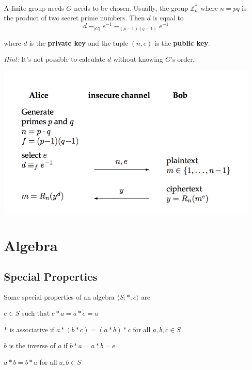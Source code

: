 \documentclass[11pt]{article}
\begin{document}
A finite group needs $G$ needs to be chosen. Usually, the group $\mathbb{Z}_n^*$ where $n=pq$ is the product of two secret prime numbers. Then $d$ is equal to
\begin{equation*}
	d \equiv_{|G|} e^{-1} \equiv_{(p-1)(q-1)} e^{-1}
\end{equation*}

where $d$ is the \textbf{private key} and the tuple $(n,e)$ is the \textbf{public key}.

\emph{Hint:} It's not possible to calculate $d$ without knowing $G$'s order.

\begin{center}
	\includegraphics[width=400pt]{images/rsa}
\end{center}

\section{Algebra}

\subsection{Special Properties}

Some special properties of an algebra $\langle S; *, e\rangle$ are

\begin{description}[labelindent=16pt,style=multiline,leftmargin=5.5cm, noitemsep]
	\item[neutral element:] $e \in S$ such that $e * a = a * e = a$
	\item[associativity:] $*$ is associative if $a *(b*c) = (a*b)*c$ for all $a,b,c \in S$ 
	\item[inverse element:] $b$ is the inverse of $a$ if $b * a = a*b = e$
	\item[commutative/abelian:] $a*b = b*a$ for all $a,b \in S$
\end{description}
\end{document}
